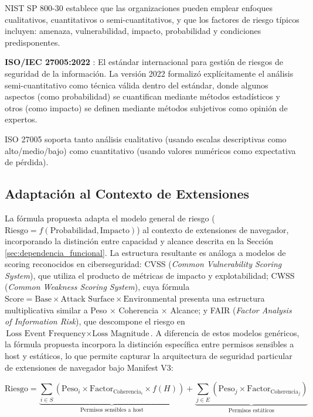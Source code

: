 \documentclass[12pt,oneside]{report}
\begin{document}
NIST SP 800-30 establece que las organizaciones pueden emplear enfoques cualitativos, cuantitativos o semi-cuantitativos, y que los factores de riesgo típicos incluyen: amenaza, vulnerabilidad, impacto, probabilidad y condiciones predisponentes.

\textbf{ISO/IEC 27005:2022} \cite{iso_27005}: El estándar internacional para gestión de riesgos de seguridad de la información. La versión 2022 formalizó explícitamente el análisis semi-cuantitativo como técnica válida dentro del estándar, donde algunos aspectos (como probabilidad) se cuantifican mediante métodos estadísticos y otros (como impacto) se definen mediante métodos subjetivos como opinión de expertos.

ISO 27005 soporta tanto análisis cualitativo (usando escalas descriptivas como alto/medio/bajo) como cuantitativo (usando valores numéricos como expectativa de pérdida).

\subsection{Adaptación al Contexto de Extensiones}

La fórmula propuesta adapta el modelo general de riesgo ($\text{Riesgo} = f(\text{Probabilidad}, \text{Impacto})$) al contexto de extensiones de navegador, incorporando la distinción entre capacidad y alcance descrita en la Sección \ref{sec:dependencia_funcional}. La estructura resultante es análoga a modelos de scoring reconocidos en ciberseguridad: CVSS (\textit{Common Vulnerability Scoring System}), que utiliza el producto de métricas de impacto y explotabilidad; CWSS (\textit{Common Weakness Scoring System}), cuya fórmula $\text{Score} = \text{Base} \times \text{Attack Surface} \times \text{Environmental}$ presenta una estructura multiplicativa similar a Peso $\times$ Coherencia $\times$ Alcance; y FAIR (\textit{Factor Analysis of Information Risk}), que descompone el riesgo en $\text{Loss Event Frequency} \times \text{Loss Magnitude}$. A diferencia de estos modelos genéricos, la fórmula propuesta incorpora la distinción específica entre permisos sensibles a host y estáticos, lo que permite capturar la arquitectura de seguridad particular de extensiones de navegador bajo Manifest V3:

\begin{equation}
\text{Riesgo} = \underbrace{\sum_{i \in S} (\text{Peso}_i \times \text{Factor}_{\text{Coherencia}_i} \times f(H))}_{\text{Permisos sensibles a host}} + \underbrace{\sum_{j \in E} (\text{Peso}_j \times \text{Factor}_{\text{Coherencia}_j})}_{\text{Permisos estáticos}}
\end{equation}
\end{document}
